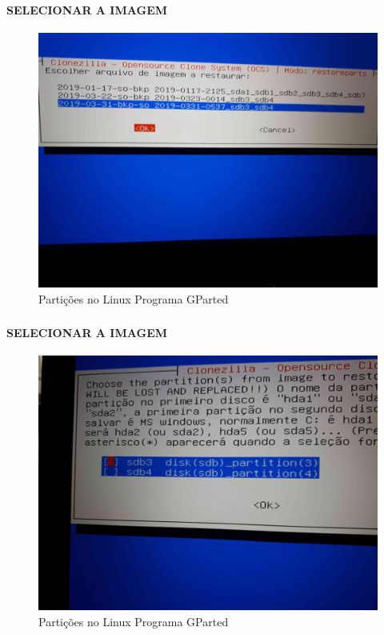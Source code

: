 \documentclass{beamer}
\begin{document}
\begin{frame}[plain,c]
   \frametitle{\insertsection}
    \framesubtitle{SELECIONAR A IMAGEM}
    \begin{figure}[!h]
        \includegraphics[width=1\linewidth]{images/rest/res8.jpg}
        \caption{Partições no Linux Programa GParted}
    \end{figure}
\end{frame}	

\begin{frame}[plain,c]
   \frametitle{\insertsection}
    \framesubtitle{SELECIONAR A IMAGEM}
    \begin{figure}[!h]
        \includegraphics[width=1\linewidth]{images/rest/res9.jpg}
        \caption{Partições no Linux Programa GParted}
    \end{figure}
\end{frame}	
\end{document}
